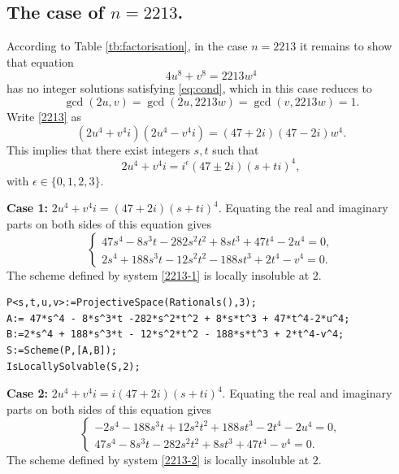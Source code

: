 \documentclass[a4paper,12pt,english,reqno]{amsart}
\begin{document}
\subsection{The case of $n=2213$.}%
According to Table \ref{tb:factorisation}, in the case $n=2213$ it remains to
show that equation 
\begin{equation}\label{2213}
4 u^8+v^8=2213  w^4
\end{equation}
has no integer solutions satisfying \eqref{eq:cond}, which in this case reduces to \[\gcd(2u,v)=\gcd(2u,2213w)=\gcd(v,2213w)=1.\]   Write \eqref{2213} as
\begin{equation} (2u^4+v^4i)(2u^4-v^4i)=(47+2i)(47-2i)w^4.
\end{equation}
This implies that there exist integers $s,t$ such that 
\[2u^4+v^4i=i^{\epsilon}(47\pm 2i)(s+ti)^4,\]
with $\epsilon \in \{0,1,2,3\}$.


{\bf Case 1:} $2u^4+v^4i=(47+2i)(s+ti)^4$. Equating the real and imaginary parts on both sides of this equation gives
\begin{equation}\label{2213-1}
\begin{cases}
47s^4 - 8s^3t - 282s^2t^2 + 8st^3 + 47t^4 - 2u^4=0,\\
2s^4 + 188s^3t - 12s^2t^2 - 188st^3 + 2t^4 - v^4=0.
\end{cases}
\end{equation}
The scheme defined by system \eqref{2213-1} is locally insoluble at $2$.


\begin{lstlisting}
P<s,t,u,v>:=ProjectiveSpace(Rationals(),3);
A:= 47*s^4 - 8*s^3*t -282*s^2*t^2 + 8*s*t^3 + 47*t^4-2*u^4;
B:=2*s^4 + 188*s^3*t - 12*s^2*t^2 - 188*s*t^3 + 2*t^4-v^4;
S:=Scheme(P,[A,B]);
IsLocallySolvable(S,2);
\end{lstlisting}

{\bf Case 2:} $2u^4+v^4i=i(47+2i)(s+ti)^4$. Equating the real and imaginary parts on both sides of this equation gives
\begin{equation}\label{2213-2}
\begin{cases}
-2s^4 - 188s^3t + 12s^2t^2 + 188st^3 - 2t^4 - 2u^4=0,\\
47s^4 - 8s^3t - 282s^2t^2 + 8st^3 + 47t^4 - v^4=0.
\end{cases}
\end{equation}
The scheme defined by system \eqref{2213-2} is locally insoluble at $2$.
\end{document}

